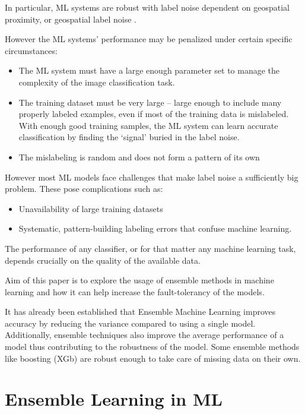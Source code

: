 \documentclass{article}
\begin{document}
In particular, ML systems are robust with label noise dependent on geospatial proximity, or geospatial label noise \cite{frank_rebbapragada_bialas_oommen_havens_2017}. 

However the ML systems' performance may be penalized under certain specific circumstances:

\begin{itemize}
    \item The ML system must have a large enough parameter set to manage the complexity of the image classification task.  
    \item The training dataset must be very large – large enough to include many properly labeled examples, even if most of the training data is mislabeled. With enough good training samples, the ML system can learn accurate classification by finding the ‘signal’ buried in the label noise.
    \item The mislabeling is random and does not form a pattern of its own \cite{noisyLabel_2021}
\end{itemize}

However most ML models face challenges that make label noise a sufficiently big problem. These pose  complications such as:

\begin{itemize}
    \item Unavailability of large training datasets
    \item Systematic, pattern-building labeling errors that confuse machine learning.
\end{itemize}

The performance of any classifier, or for that matter any machine learning task, depends crucially on the quality of the available data.


Aim of this paper is to explore the usage of ensemble methods in machine learning and how it can help increase the fault-tolerancy of the models.

It has already been established that Ensemble Machine Learning improves accuracy by reducing the variance compared to using a single model. Additionally, ensemble techniques also improve the average performance of a model thus contributing to the robustness of the model. Some ensemble methods like boosting (XGb) are robust enough to take care of missing data on their own.

\section{Ensemble Learning in ML}
\end{document}
